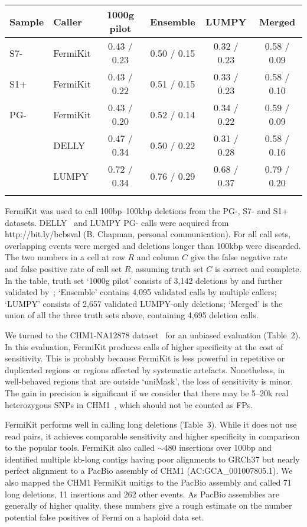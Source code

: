 \documentclass{bioinfo}
\begin{document}
\begin{table}[t]
{\footnotesize
\begin{tabular}{llcccc}
\toprule
Sample& Caller  & {1000g pilot} & {Ensemble} & {LUMPY} & {Merged}\\
\midrule
S7- & FermiKit  & 0.43 / 0.23 & 0.50 / 0.15 & 0.32 / 0.23 & 0.58 / 0.09 \\
S1+ & FermiKit  & 0.43 / 0.22 & 0.51 / 0.15 & 0.33 / 0.23 & 0.58 / 0.10 \\
PG- & FermiKit  & 0.43 / 0.20 & 0.52 / 0.14 & 0.34 / 0.22 & 0.59 / 0.09\\
    & DELLY     & 0.47 / 0.34 & 0.50 / 0.22 & 0.31 / 0.28 & 0.58 / 0.16\\
    & LUMPY     & 0.72 / 0.34 & 0.76 / 0.29 & 0.68 / 0.37 & 0.79 / 0.20\\
\botrule
\end{tabular}}{FermiKit was used to call 100bp--100kbp deletions from the
PG-, S7- and S1+ datasets. DELLY~\citep{Rausch:2012aa} and LUMPY PG- calls were
acquired from http://bit.ly/bcbsval (B. Chapman, personal communication). For
all call sets, overlapping events were merged and deletions longer than 100kbp
were discarded.  The two numbers in a cell at row $R$ and column $C$ give the
false negative rate and false positive rate of call set $R$, assuming truth set
$C$ is correct and complete.  In the table, truth set `1000g pilot' consists of
3,142 deletions by \citet{Mills:2011aa} and further validated
by~\citet{Layer:2014aa}; `Ensemble' contains 4,095 validated calls by multiple
callers; `LUMPY' consists of 2,657 validated LUMPY-only deletions; `Merged' is the
union of all the three truth sets above, containing 4,695 deletion calls.}
\end{table}

We turned to the CHM1-NA12878 dataset~\citep{Li:2014aa} for an unbiased
evaluation (Table~2). In this evaluation, FermiKit produces calls of higher
specificity at the cost of sensitivity. This is probably because FermiKit is
less powerful in repetitive or duplicated regions or regions affected by
systematic artefacts. Nonetheless, in well-behaved regions that are outside
`uniMask', the loss of sensitivity is minor. The gain in precision is
significant if we consider that there may be 5--20k real heterozygous SNPs in
CHM1~\citep{Li:2014aa}, which should not be counted as FPs.

FermiKit performs well in calling long deletions (Table~3). While
it does not use read pairs, it achieves comparable sensitivity and higher
specificity in comparison to the popular tools. FermiKit also called $\sim$480
insertions over 100bp and identified multiple kb-long contigs having 
poor alignments to GRCh37 but nearly perfect alignment to a PacBio assembly of
CHM1 (AC:GCA\_001007805.1). We also mapped the CHM1 FermiKit unitigs to
the PacBio assembly and called 71 long deletions, 11 insertions and 262 other events.
As PacBio assemblies are generally of higher quality, these numbers give a
rough estimate on the number potential false positives of Fermi on a haploid data set.
\end{document}
